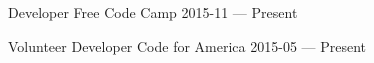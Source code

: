 


\begin{cventries}

  \cventry
    {Developer} %
    {Free Code Camp} %
    {} %
    {2015-11 — Present} %
    {}


  \cventry
    {Volunteer Developer} %
    {Code for America} %
    {} %
    {2015-05 — Present} %
    {}


\end{cventries}

